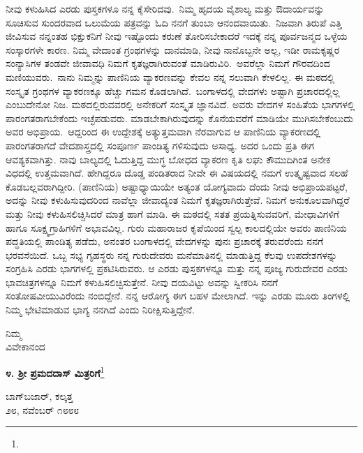 ನೀವು ಕಳುಹಿಸಿದ ಎರಡು ಪುಸ್ತಕಗಳೂ ನನ್ನ ಕೈಸೇರಿದವು.~ನಿಮ್ಮ ಹೃದಯ ವೈಶಾಲ್ಯ ಮತ್ತು ಔದಾರ್ಯವನ್ನು ಸೂಚಿಸುವ ಸುಂದರವಾದ ಒಲುಮೆಯ ಪತ್ರವನ್ನು ಓದಿ ನನಗೆ ತುಂಬಾ ಆನಂದವಾಯಿತು.~ನಿಜವಾಗಿ ತಿರುಪೆ ಎತ್ತಿ ಜೀವಿಸುವ ನನ್ನಂತಹ ಭಿಕ್ಷುಕನಿಗೆ ನೀವು ಇಷ್ಟೊಂದು ಕರುಣೆ ತೋರಿಸಬೇಕಾದರೆ ಇದಕ್ಕೆ ನನ್ನ ಪೂರ್ವಜನ್ಮದ ಒಳ್ಳೆಯ ಸಂಸ್ಕಾರಗಳೇ ಕಾರಣ. ನಿಮ್ಮ ವೇದಾಂತ ಗ್ರಂಥಗಳನ್ನು ದಾನಮಾಡಿ, ನೀವು ನಾನೊಬ್ಬನೇ ಅಲ್ಲ, ಇಡೀ ರಾಮಕೃಷ್ಣರ ಸಂನ್ಯಾಸಿಗಳ ತಂಡವೇ ಜೀವಾವಧಿ ನಿಮಗೆ ಕೃತಜ್ಞರಾಗಿರುವಂತೆ ಮಾಡಿರುವಿರಿ.~ಅವರೆಲ್ಲಾ ನಿಮಗೆ ಗೌರವದಿಂದ ಮಣಿಯುವರು.~ನಾನು ನಿಮ್ಮನ್ನು ಪಾಣಿನಿಯ ವ್ಯಾಕರಣವನ್ನು ಕೇವಲ ನನ್ನ ಸಲುವಾಗಿ ಕೇಳಲಿಲ್ಲ. ಈ ಮಠದಲ್ಲಿ ಸಂಸ್ಕೃತ ಗ್ರಂಥಗಳ ವ್ಯಾಕರಣಕ್ಕೂ ಹೆಚ್ಚು ಗಮನ ಕೊಡಲಾಗಿದೆ.~ಬಂಗಾಳದಲ್ಲಿ ವೇದಗಳು ಅಷ್ಟಾಗಿ ಪ್ರಚಾರದಲ್ಲಿಲ್ಲ ಎಂಬುದೇನೋ ನಿಜ. ಮಠದಲ್ಲಿರುವವರಲ್ಲಿ ಅನೇಕರಿಗೆ ಸಂಸ್ಕೃತ ಜ್ಞಾನವಿದೆ. ಅವರು ವೇದಗಳ ಸಂಹಿತೆಯ ಭಾಗಗಳಲ್ಲಿ ಪಾರಂಗತರಾಗಬೇಕೆಂದು ಇಚ್ಛೆಪಡುವರು. ಮಾಡಬೇಕಾಗಿರುವುದನ್ನು ಕೊನೆಯವರೆಗೆ ಮಾಡಿಯೇ ಮುಗಿಸಬೇಕೆಂಬುದು ಅವರ ಅಭಿಪ್ರಾಯ.~ಆದ್ದರಿಂದ ಈ ಉದ್ದೇಶಕ್ಕೆ ಅತ್ಯುತ್ತಮವಾಗಿ ನೆರವಾಗುವ ಆ ಪಾಣಿನಿಯ ವ್ಯಾಕರಣದಲ್ಲಿ ಪಾರಂಗತರಾಗದೆ ವೇದಶಾಸ್ತ್ರದಲ್ಲಿ ಸಂಪೂರ್ಣ ಪಾಂಡಿತ್ಯ ಗಳಿಸುವುದು ಅಸಾಧ್ಯ. ಅದರ ಒಂದು ಪ್ರತಿ ಈಗ ಆವಶ್ಯಕವಾಗಿತ್ತು. ನಾವು ಬಾಲ್ಯದಲ್ಲಿ ಓದುತ್ತಿದ್ದ ಮುಗ್ಧ ಬೋಧದ ವ್ಯಾಕರಣ ಕೃತಿ ಲಘು ಕೌಮುದಿಗಿಂತ ಅನೇಕ ವಿಧದಲ್ಲಿ ಉತ್ತಮವಾಗಿದೆ. ಹೇಗಿದ್ದರೂ ದೊಡ್ಡ ಪಂಡಿತರಾದ ನೀವೇ ಈ ವಿಷಯದಲ್ಲಿ ನಮಗೆ ಉತ್ಕೃಷ್ಟವಾದ ಸಲಹೆ ಕೊಡಬಲ್ಲವರಾಗಿದ್ದೀರಿ. (ಪಾಣಿನಿಯ) ಅಷ್ಟಾಧ್ಯಾಯಿಯೇ ಅತ್ಯಂತ ಯೋಗ್ಯವಾದು ದೆಂದು ನೀವು ಅಭಿಪ್ರಾಯಪಟ್ಟರೆ, ಅದನ್ನು ನೀವು ಕಳುಹಿಸುವುದರಿಂದ ನಾವೆಲ್ಲಾ ಜೀವಾದ್ಯಂತ ನಿಮಗೆ ಕೃತಜ್ಞರಾಗಿರುತ್ತೇವೆ. ನಿಮಗೆ ಅನುಕೂಲವಾಗಿದ್ದರೆ ಮತ್ತು ನೀವು ಕಳುಹಿಸಲಿಚ್ಚಿಸಿದರೆ ಮಾತ್ರ ಹಾಗೆ ಮಾಡಿ. ಈ ಮಠದಲ್ಲಿ ಸತತ ಪ್ರಯತ್ನಿಸುವವರಿಗೆ, ಮೇಧಾವಿಗಳಿಗೆ ಹಾಗೂ ಸೂಕ್ಷ್ಮಗ್ರಾಹಿಗಳಿಗೆ ಅಭಾವವಿಲ್ಲ. ಗುರು ಮಹಾರಾಜರ ಕೃಪೆಯಿಂದ ಸ್ವಲ್ಪ ಕಾಲದಲ್ಲಿಯೇ ಅವರು ಪಾಣಿನಿಯ ಪದ್ಧತಿಯಲ್ಲಿ ಪಾಂಡಿತ್ಯ ಪಡೆದು, ಅನಂತರ ಬಂಗಾಳದಲ್ಲಿ ವೇದಗಳನ್ನು ಪುನಃ ಪ್ರಚಾರಕ್ಕೆ ತರುವರೆಂದು ನನಗೆ ಭರವಸೆಯಿದೆ. ಒಬ್ಬ ಸಭ್ಯ ಗೃಹಸ್ಥರು ನನ್ನ ಗುರುದೇವರು ಮನೆಮಾತಿನಲ್ಲಿ ಮಾಡುತ್ತಿದ್ದ ಕೆಲವು ಉಪದೇಶಗಳನ್ನು ಸಂಗ್ರಹಿಸಿ ಎರಡು ಭಾಗಗಳಲ್ಲಿ ಪ್ರಕಟಿಸಿರುವರು. ಆ ಎರಡು ಪುಸ್ತಕಗಳನ್ನೂ ಮತ್ತು ನನ್ನ ಪೂಜ್ಯ ಗುರುದೇವರ ಎರಡು ಭಾವಚಿತ್ರಗಳನ್ನೂ ನಿಮಗೆ ಕಳು\break ಹಿಸಲಿಚ್ಛಿಸುತ್ತೇನೆ. ನೀವು ದಯವಿಟ್ಟು ಅವನ್ನು ಸ್ವೀಕರಿಸಿ ನನಗೆ ಸಂತೋಷವೀಯುವಿರೆಂದು ನಂಬಿದ್ದೇನೆ. ನನ್ನ ಆರೋಗ್ಯ ಈಗ ಬಹಳ ಮೇಲಾಗಿದೆ. ಇನ್ನು ಎರಡು ಮೂರು ತಿಂಗಳಲ್ಲಿ ನಿಮ್ಮ ಭೇಟಿಮಾಡುವ ಭಾಗ್ಯ ನನಗಿದೆ ಎಂದು ನಿರೀಕ್ಷಿಸುತ್ತಿದ್ದೇನೆ.
\vspace{-0.5cm}

{\flushright
ನಿಮ್ಮ\\ವಿವೇಕಾನಂದ\par}

\begin{center}
\textbf{೪. ಶ‍್ರೀ ಪ್ರಮದದಾಸ್ ಮಿತ್ರರಿಗೆ}\footnote{}
\end{center}
\vspace{-0.5cm}

\begin{flushright}
ಬಾಗ್‌ಬಜಾರ್, ಕಲ್ಕತ್ತ \\೨೮, ನವೆಂಬರ್ ೧೮೮೮
\end{flushright}

